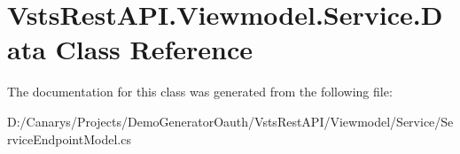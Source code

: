 \hypertarget{class_vsts_rest_a_p_i_1_1_viewmodel_1_1_service_1_1_data}{}\section{Vsts\+Rest\+A\+P\+I.\+Viewmodel.\+Service.\+Data Class Reference}
\label{class_vsts_rest_a_p_i_1_1_viewmodel_1_1_service_1_1_data}


The documentation for this class was generated from the following file\+:\begin{DoxyCompactItemize}
\item 
D\+:/\+Canarys/\+Projects/\+Demo\+Generator\+Oauth/\+Vsts\+Rest\+A\+P\+I/\+Viewmodel/\+Service/Service\+Endpoint\+Model.\+cs\end{DoxyCompactItemize}
